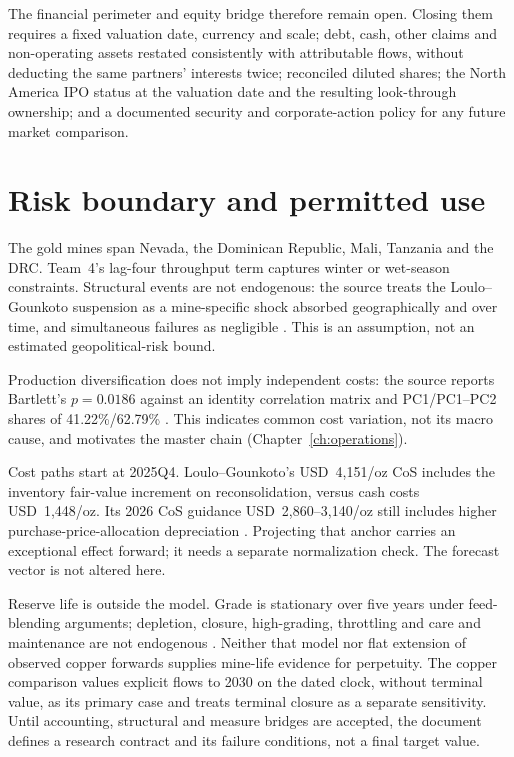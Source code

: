 The financial perimeter and equity bridge therefore remain open. Closing them
requires a fixed valuation date, currency and scale; debt, cash, other claims
and non-operating assets restated consistently with attributable flows,
without deducting the same partners' interests twice; reconciled diluted
shares; the North America IPO status at the valuation date and the resulting
look-through ownership; and a documented security and corporate-action policy
for any future market comparison.

\section{Risk boundary and permitted use}
\label{sec:company-risk-boundary}

The gold mines span Nevada, the Dominican Republic, Mali, Tanzania and the
DRC. Team~4's lag-four throughput term captures winter or wet-season
constraints. Structural events are not endogenous: the source treats the
Loulo--Gounkoto suspension as a mine-specific shock absorbed geographically
and over time, and simultaneous failures as negligible \cite{team4}.
This is an assumption, not an estimated geopolitical-risk bound.

Production diversification does not imply independent costs: the source
reports Bartlett's $p=0.0186$ against an identity correlation matrix and
PC1/PC1--PC2 shares of 41.22\%/62.79\% \cite{team4}. This indicates common
cost variation, not its macro cause, and motivates the master chain
(Chapter~\ref{ch:operations}).

Cost paths start at 2025Q4. Loulo--Gounkoto's USD~4,151/oz CoS includes the
inventory fair-value increment on reconsolidation, versus cash costs
USD~1,448/oz. Its 2026 CoS guidance USD~2,860--3,140/oz still includes higher
purchase-price-allocation depreciation \cite{barrick-ar-2025}. Projecting
that anchor carries an exceptional effect forward; it needs a separate
normalization check. The forecast vector is not altered here.

Reserve life is outside the model. Grade is stationary over five years under
feed-blending arguments; depletion, closure, high-grading, throttling and
care and maintenance are not endogenous \cite{team4}. Neither that model
nor flat extension of observed copper forwards supplies mine-life evidence
for perpetuity. The copper comparison values explicit flows to 2030 on the
dated clock, without terminal value, as its primary case and treats terminal
closure as a separate sensitivity. Until accounting, structural
and measure bridges are accepted, the document defines a research contract
and its failure conditions, not a final target value.
